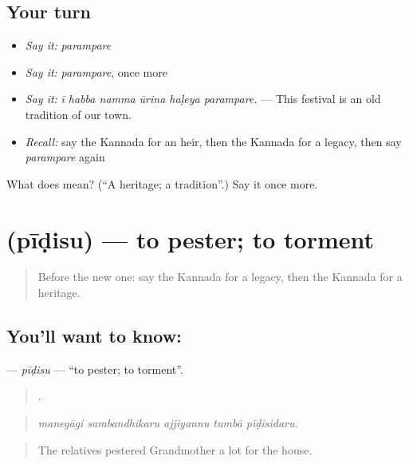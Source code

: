 \subsection*{Your turn}
\begin{itemize}
\raggedright
  \item \emph{Say it:} \emph{parampare}
  \item \emph{Say it:} \emph{parampare}, once more
  \item \emph{Say it:} \emph{ī habba namma ūrina haḷeya parampare.} — This festival is an old tradition of our town.
  \item \emph{Recall:} say the Kannada for an heir, then the Kannada for a legacy, then say \emph{parampare} again
\end{itemize}

\begin{tcolorbox}[breakable,colback=teal!4,colframe=teal!35!black,title={Before you move on}]
What does  mean? (\textquotedblleft{}A heritage; a tradition\textquotedblright{}.) Say it once more.
\end{tcolorbox}
\section[\texorpdfstring{\kn{ಪೀಡಿಸು} (pīḍisu)}{ಪೀಡಿಸು (pīḍisu)}]{ (pīḍisu) — to pester; to torment}

\label{lesson:KA-C353-pidisu}



\begin{quote}
Before the new one: say the Kannada for a legacy, then the Kannada for a heritage.
\end{quote}

\subsection*{You'll want to know: }
\textbf{} — \emph{pīḍisu} — \textquotedblleft{}to pester; to torment\textquotedblright{}.

\begin{quote}
    .
\end{quote}

\begin{quote}
\emph{manegāgi sambandhikaru ajjiyannu tumbā pīḍisidaru.}
\end{quote}

\begin{quote}
The relatives pestered Grandmother a lot for the house.
\end{quote}

